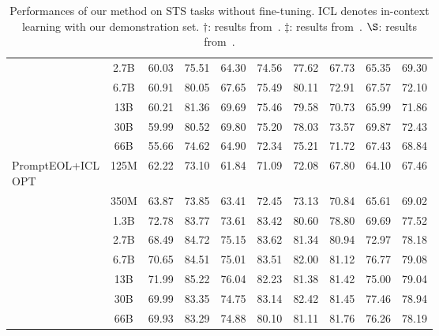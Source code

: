 \documentclass{article}
\begin{document}
\begin{table}[t]
{\begin{tabular}{lccccccccc}
& 2.7B & 60.03 & 75.51 & 64.30 & 74.56 & 77.62 & 67.73 & 65.35 & 69.30 \\
& 6.7B & 60.91 & 80.05 & 67.65 & 75.49 & 80.11 & 72.91 & 67.57 & 72.10 \\
& 13B &  60.21 & 81.36 & 69.69 & 75.46 & 79.58 & 70.73 & 65.99 & 71.86 \\
& 30B &  59.99 & 80.52 & 69.80 & 75.20 & 78.03 & 73.57 & 69.87 & 72.43\\
& 66B &  55.66 & 74.62 & 64.90 & 72.34 & 75.21 & 71.72 & 67.43 & 68.84 \\
\midrule
\multirowcell{8}[0pt][l]{PromptEOL+ICL\\OPT}
 &  125M& 62.22 & 73.10 & 61.84 & 71.09 & 72.08 & 67.80 & 64.10 & 67.46 \\
 &  350M& 63.87 & 73.85 & 63.41 & 72.45 & 73.13 & 70.84 & 65.61 & 69.02 \\
 &  1.3B& 72.78 & 83.77 & 73.61 & 83.42 & 80.60 & 78.80 & 69.69 & 77.52 \\
 &  2.7B& 68.49 & 84.72 & 75.15 & 83.62 & 81.34 & 80.94 & 72.97 & 78.18 \\
 &  6.7B\cellcolor{lightcyan}& 70.65\cellcolor{lightcyan} & 84.51\cellcolor{lightcyan} & 75.01\cellcolor{lightcyan} & 83.51\cellcolor{lightcyan} & 82.00\cellcolor{lightcyan} & 81.12\cellcolor{lightcyan} & 76.77\cellcolor{lightcyan} & 79.08\cellcolor{lightcyan} \\
 &  13B & 71.99 & 85.22 & 76.04 & 82.23 & 81.38 & 81.42 & 75.00 & 79.04 \\
 &  30B & 69.99 & 83.35 & 74.75 & 83.14 & 82.42 & 81.45 & 77.46 & 78.94 \\
 &  66B & 69.93 & 83.29 & 74.88 & 80.10 & 81.11 & 81.76 & 76.26 & 78.19 \\

\bottomrule
\end{tabular}
}
\caption{ Performances of our method on STS tasks without fine-tuning. ICL denotes in-context learning with our demonstration set.
  \(\dagger\): results from~\cite{gao2021simcse}.
  \(\ddagger \): results from~\cite{jiang2022promptbert}.
  \(\S\): results from~\cite{sentencet5}.
}\label{tab:sts_wo_ft}
\vspace{-10pt}
\end{table}
\end{document}
